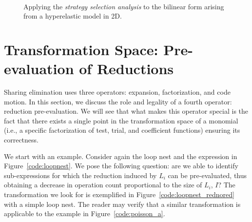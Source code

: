 \begin{figure}[htp]
\begin{CenteredBox}

\begin{subfigure}{0.55\textwidth}

\label{code:hyper_a}
\end{subfigure}
~~~~~~
\begin{subfigure}{0.65\textwidth}

\label{code:hyper_b}
\end{subfigure}

\end{CenteredBox}

\caption{Applying the {\em strategy selection analysis} to the bilinear form arising from a hyperelastic model in 2D.}
\label{code:hyperelasticity}
\end{figure}

\clearpage

\section{Transformation Space: Pre-evaluation of Reductions}
\label{sec:pre-evaluation}
Sharing elimination uses three operators: expansion, factorization, and code motion. In this section, we discuss the role and legality of a fourth operator: reduction pre-evaluation. We will see that what makes this operator special is the fact that there exists a single point in the transformation space of a monomial (i.e., a specific factorization of test, trial, and coefficient functions) ensuring its correctness.

We start with an example. Consider again the loop nest and the expression in Figure~\ref{code:loopnest}. We pose the following question: are we able to identify sub-expressions for which the reduction induced by $L_i$ can be pre-evaluated, thus obtaining a decrease in operation count proportional to the size of $L_i$, $I$? The transformation we look for is exemplified in Figure~\ref{code:loopnest_rednored} with a simple loop nest. The reader may verify that a similar transformation is applicable to the example in Figure~\ref{code:poisson_a}.

